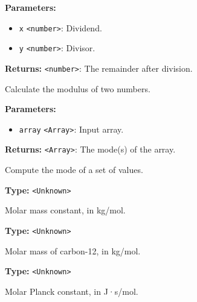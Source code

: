 \documentclass[12pt,a4paper]{article}
\begin{document}
\noindent \textbf{Parameters:}
\begin{itemize}
  \item \texttt{x} \texttt{<number>}: Dividend.
  \item \texttt{y} \texttt{<number>}: Divisor.
\end{itemize}

\noindent \textbf{Returns:} \texttt{<number>}: The remainder after division.

\noindent Calculate the modulus of two numbers.

\vspace{5mm}
\noindent {}


\noindent \textbf{Parameters:}
\begin{itemize}
  \item \texttt{array} \texttt{<Array>}: Input array.
\end{itemize}

\noindent \textbf{Returns:} \texttt{<Array>}: The mode(s) of the array.

\noindent Compute the mode of a set of values.

\vspace{5mm}
\noindent {}\vspace{4mm}


\noindent \textbf{Type:} \texttt{<Unknown>}

\noindent Molar mass constant, in kg/mol.

\vspace{5mm}
\noindent {}\vspace{4mm}


\noindent \textbf{Type:} \texttt{<Unknown>}

\noindent Molar mass of carbon-12, in kg/mol.

\vspace{5mm}
\noindent {}\vspace{4mm}


\noindent \textbf{Type:} \texttt{<Unknown>}

\noindent Molar Planck constant, in J·s/mol.
\end{document}
